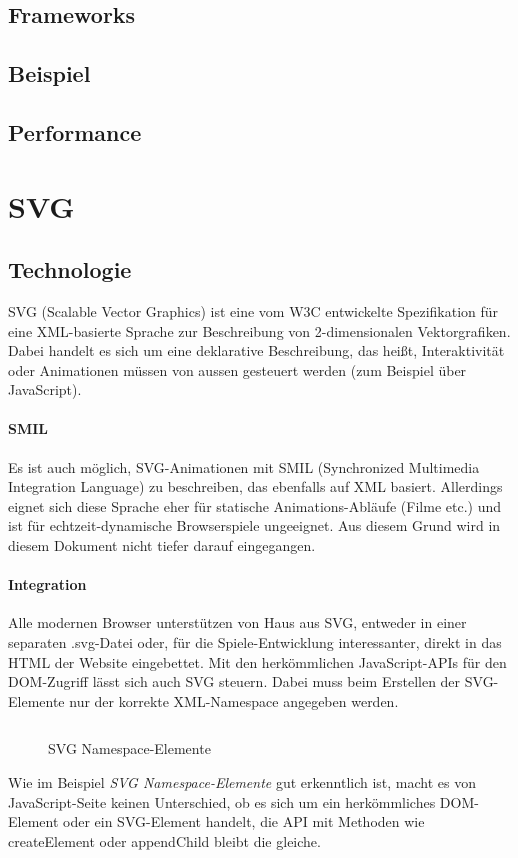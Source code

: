 \documentclass[a4paper, 12pt]{article}
\begin{document}
\subsection{Frameworks}
\subsection{Beispiel}
\subsection{Performance}
\section{SVG}
\subsection{Technologie}
SVG (Scalable Vector Graphics) ist eine vom W3C entwickelte Spezifikation für eine XML-basierte Sprache zur Beschreibung von 2-dimensionalen Vektorgrafiken. Dabei handelt es sich um eine deklarative Beschreibung, das heißt, Interaktivität oder Animationen müssen von aussen gesteuert werden (zum Beispiel über JavaScript).
\paragraph{SMIL} Es ist auch möglich, SVG-Animationen mit SMIL (Synchronized Multimedia Integration Language) zu beschreiben, das ebenfalls auf XML basiert. Allerdings eignet sich diese Sprache eher für statische Animations-Abläufe (Filme etc.) und ist für echtzeit-dynamische Browserspiele ungeeignet. Aus diesem Grund wird in diesem Dokument nicht tiefer darauf eingegangen.
\paragraph{Integration} Alle modernen Browser unterstützen von Haus aus SVG, entweder in einer separaten .svg-Datei oder, für die Spiele-Entwicklung interessanter, direkt in das HTML der Website eingebettet. Mit den herkömmlichen JavaScript-APIs für den DOM-Zugriff lässt sich auch SVG steuern. Dabei muss beim Erstellen der SVG-Elemente nur der korrekte XML-Namespace angegeben werden.
\begin{figure}[h!]
	\inputminted{javascript}{assets/svg_example.js}
	\caption{SVG Namespace-Elemente}
	\label{svg_namespace_example}
\end{figure}
Wie im Beispiel \emph{SVG Namespace-Elemente} gut erkenntlich ist, macht es von JavaScript-Seite keinen Unterschied, ob es sich um ein herkömmliches DOM-Element oder ein SVG-Element handelt, die API mit Methoden wie createElement oder appendChild bleibt die gleiche.
\end{document}
